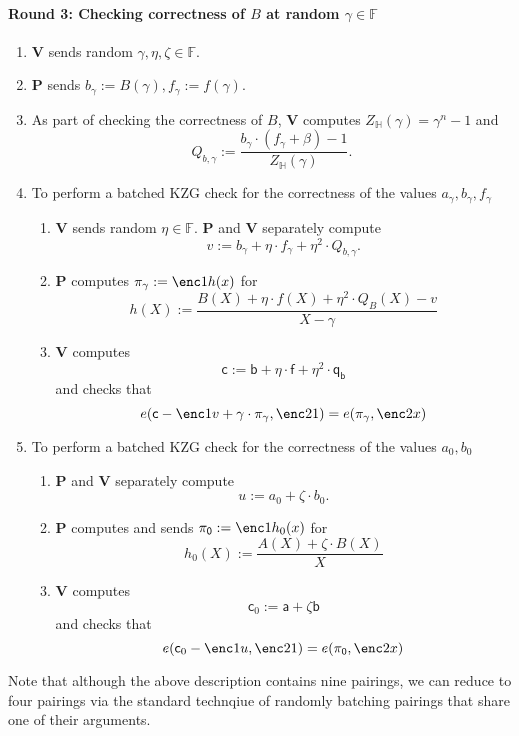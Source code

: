 \documentclass[11pt]{article} %
\newcommand{\F}{\ensuremath{\mathbb F}\xspace}
\newcommand{\defeq}{:=}
\newcommand{\prv}{\ensuremath{\mathsf{\mathbf{P}}}\xspace}
\newcommand{\ver}{\ensuremath{\mathsf{\mathbf{V}}}\xspace}
\newcommand{\subspace}{\ensuremath{\mathbb{H}}\xspace}
\newcommand{\witsize}{\ensuremath{n}\xspace}
\renewcommand{\a}{\ensuremath{\mathsf{a}}\xspace}
\renewcommand{\b}{\ensuremath{\mathsf{b}}\xspace}
\renewcommand{\c}{\ensuremath{\mathsf{c}}\xspace}
\newcommand{\f}{\ensuremath{\mathsf{f}}\xspace}
\newcommand{\qb}{\ensuremath{\mathsf{q_b}}\xspace}
\newcommand{\agam}{\ensuremath{a_\gamma}\xspace}
\newcommand{\gamproof}{\ensuremath{\mathsf{\pi_\gamma}}\xspace}
\newcommand{\zerproof}{\ensuremath{\mathsf{\pi_0}}\xspace}
\newcommand{\bgam}{\ensuremath{b_\gamma}\xspace}
\newcommand{\qbgam}{\ensuremath{Q_{b,\gamma}}\xspace}
\newcommand{\fgam}{\ensuremath{f_{\gamma}}\xspace}
\begin{document}
	\paragraph{\textbf{Round 3:} Checking correctness of  $B$ at random $\gamma \in \F$}
 \begin{enumerate}
\item \ver sends random $\gamma,\eta,\zeta \in \F$.
\item \prv sends $\bgam \defeq B(\gamma),\fgam \defeq f(\gamma)$.
\item\label{step:setQB} As part of checking the correctness of $B$, \ver computes $ Z_\subspace(\gamma) = \gamma^\witsize -1$ and
\[\qbgam\defeq \frac{\bgam\cdot (\fgam + \beta)-1}{Z_\subspace(\gamma)}.\]
\item To perform a batched KZG check for the correctness of the values  $\agam,\bgam,\fgam$
  \begin{enumerate}
   \item \ver sends random $\eta\in \F$. \prv and \ver separately compute
   \[v\defeq \bgam +\eta\cdot\fgam + \eta^2\cdot \qbgam.\]
   \item \prv computes $\gamproof\defeq \enc1{h(x)}$ for 
   \[h(X)\defeq \frac{ B(X)+ \eta\cdot f(X) + \eta^2\cdot Q_B(X) -v}{X-\gamma}\]
   \item\label{step:checkKZG1} \ver computes 
   \[\c\defeq \b+\eta\cdot \f +\eta^2\cdot \qb\]
   and  checks that 
   \[e(\c-\enc1{v}+\gamma\cdot \gamproof,\enc2{1})=e(\gamproof,\enc2{x})\]
  \end{enumerate}
\item To perform a batched KZG check for the correctness of the values  $a_0,b_0$
  \begin{enumerate}
   \item  \prv and \ver separately compute
   \[u\defeq a_0+\zeta \cdot b_0.\] 
   \item \prv computes and sends $\zerproof\defeq \enc1{h_0(x)}$ for 
   \[h_0(X)\defeq \frac{A(X)+\zeta\cdot B(X)}{X}\]
   \item\label{step:checkKZG2} \ver computes 
   \[\c_0 \defeq \a +\zeta \b\]
   and  checks that 
   \[e(\c_0-\enc1{u},\enc2{1})=e(\zerproof,\enc2{x})\]
  \end{enumerate}

\end{enumerate}

Note that although the above description contains nine pairings, we can reduce to four pairings via the standard technqiue of randomly batching
pairings that share one of their arguments.
                     
\end{document}
